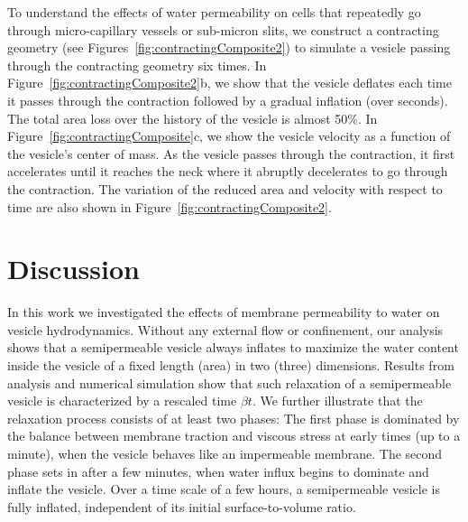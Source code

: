 \documentclass[9pt,twocolumn,twoside,lineno]{pnas-new}
\begin{document}
To understand the effects of water permeability on cells that repeatedly
go through micro-capillary vessels or sub-micron slits, we construct a
contracting geometry (see Figures~\ref{fig:contractingComposite2}) to
simulate a vesicle passing through the contracting geometry six times.
In Figure~\ref{fig:contractingComposite2}b, we show that the vesicle
deflates each time it passes through the contraction followed by a
gradual inflation (over seconds). The total area loss over the history
of the vesicle is almost 50\%. In
Figure~\ref{fig:contractingComposite}c, we show the vesicle velocity as
a function of the vesicle's center of mass. As the vesicle passes
through the contraction, it first accelerates until it reaches the neck
where it abruptly decelerates to go through the contraction. The
variation of the reduced area and velocity with respect to time are also
shown in Figure~\ref{fig:contractingComposite2}.

%


\section*{Discussion}
In this work we investigated the effects of membrane permeability to
water on vesicle hydrodynamics. Without any external flow or
confinement, our analysis shows that a semipermeable vesicle always
inflates to maximize the water content inside the vesicle of a fixed
length (area) in two (three) dimensions. Results from analysis and
numerical simulation show that such relaxation of a semipermeable
vesicle is characterized by a rescaled time $\beta t$. We further
illustrate that the relaxation process consists of at least two phases:
The first phase is dominated by the balance between membrane traction
and viscous stress at early times (up to a minute), when the vesicle
behaves like an impermeable membrane. The second phase sets in after a
few minutes, when water influx begins to dominate and inflate the
vesicle. Over a time scale of a few hours, a semipermeable vesicle is
fully inflated, independent of its initial surface-to-volume ratio.
\end{document}
